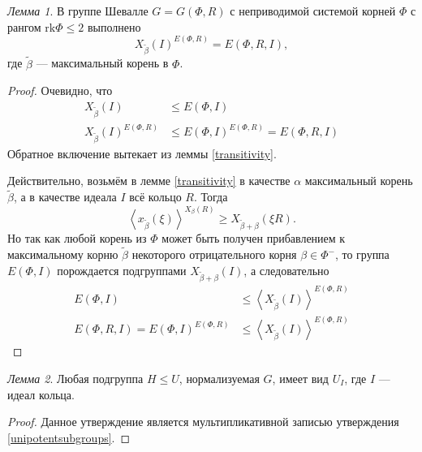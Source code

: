 \documentclass[10pt]{article}
\theoremstyle{remark}
\newtheorem{lm}{Лемма}
\renewcommand{\le}{\leqslant}
\renewcommand{\ge}{\geqslant}
\begin{document}
\begin{lm} \label{maximalgenerates}
  В группе Шевалле $G=G(\Phi,R)$ с неприводимой системой корней $\Phi$ с рангом $\mathrm{rk}\Phi \le 2$ выполнено
  $$X_{\widetilde\beta}(I)^{E(\Phi,R)} = E(\Phi,R,I),$$
  где $\widetilde\beta$ --- максимальный корень в $\Phi$.
\end{lm}
\begin{proof}
  Очевидно, что
\begin{align*}
  X_{\widetilde\beta}(I) &\le E(\Phi,I) \\
  X_{\widetilde\beta}(I)^{E(\Phi,R)} &\le E(\Phi,I)^{E(\Phi,R)} = E(\Phi,R,I)
\end{align*}
  Обратное включение вытекает из леммы \ref{transitivity}.
  
  Действительно, возьмём в лемме \ref{transitivity} в качестве $\alpha$ максимальный корень $\widetilde{\beta}$, а в качестве идеала $I$ всё кольцо $R$. Тогда
  $$ \left< x_{\widetilde\beta}(\xi) \right>^{X_\beta(R)} \ge X_{\widetilde\beta + \beta}(\xi R). $$
  Но так как любой корень из $\Phi$ может быть получен прибавлением к максимальному корню $\widetilde\beta$ некоторого отрицательного корня $\beta \in \Phi^-$, то группа $E(\Phi,I)$ порождается подгруппами $X_{\widetilde\beta + \beta}(I)$, а следовательно 
\begin{align*}
E(\Phi,I) &\le \left< X_{\widetilde\beta}(I) \right>^{E(\Phi,R)}\\
  E(\Phi,R,I) = E(\Phi,I)^{E(\Phi,R)} &\le \left< X_{\widetilde\beta}(I) \right>^{E(\Phi,R)}
\end{align*}
\end{proof}


\begin{lm}\label{unipotenttransitivity}
  Любая подгруппа $H \le U$, нормализуемая $G$, имеет вид $U_I$, где $I$ --- идеал кольца.
\end{lm}
\begin{proof}
  Данное утверждение является мультипликативной записью утверждения \ref{unipotentsubgroups}.
\end{proof}
\end{document}

